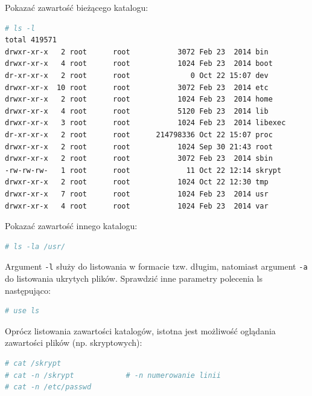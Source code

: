 \documentclass[11pt,twoside,a4paper]{article}
\begin{document}
\begin{example}\label{ex:wylistowanie} 

Pokazać zawartość bieżącego katalogu: 

\begin{lstlisting}[language=bash]
# ls -l 
total 419571
drwxr-xr-x   2 root      root           3072 Feb 23  2014 bin
drwxr-xr-x   4 root      root           1024 Feb 23  2014 boot
dr-xr-xr-x   2 root      root              0 Oct 22 15:07 dev
drwxr-xr-x  10 root      root           3072 Feb 23  2014 etc
drwxr-xr-x   2 root      root           1024 Feb 23  2014 home
drwxr-xr-x   4 root      root           5120 Feb 23  2014 lib
drwxr-xr-x   3 root      root           1024 Feb 23  2014 libexec
dr-xr-xr-x   2 root      root      214798336 Oct 22 15:07 proc
drwxr-xr-x   2 root      root           1024 Sep 30 21:43 root
drwxr-xr-x   2 root      root           3072 Feb 23  2014 sbin
-rw-rw-rw-   1 root      root             11 Oct 22 12:14 skrypt
drwxr-xr-x   2 root      root           1024 Oct 22 12:30 tmp
drwxr-xr-x   7 root      root           1024 Feb 23  2014 usr
drwxr-xr-x   4 root      root           1024 Feb 23  2014 var
\end{lstlisting}

Pokazać zawartość innego katalogu: 

\begin{lstlisting}[language=bash]
# ls -la /usr/
\end{lstlisting}

Argument \lstinline{-l} służy do listowania w formacie tzw. długim, natomiast argument \lstinline{-a} do listowania ukrytych plików. Sprawdzić inne parametry polecenia ls następująco:  

\begin{lstlisting}[language=bash]
# use ls
\end{lstlisting}
\end{example}

\begin{example}\label{ex:obejrzenie} 

Oprócz listowania zawartości katalogów, istotna jest możliwość oglądania zawartości plików (np. skryptowych):

\begin{lstlisting}[language=bash]
# cat /skrypt
# cat -n /skrypt			# -n numerowanie linii
# cat -n /etc/passwd
\end{lstlisting}
\end{example}
\end{document}
